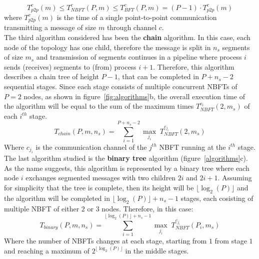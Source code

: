 \documentclass[../main.tex]{subfiles}
\begin{document}
\begin{equation}\label{eq:nbft-inequality}
    T^{c}_{p2p}(m) \leq T^{c}_{NBFT}(P,m) \leq T^{c}_{BFT}(P,m) = (P-1) \cdot T^{c}_{p2p}(m)
\end{equation}
where $T^{c}_{p2p}(m)$ is the time of a single point-to-point communication transmitting a message of size $m$ through channel $c$.\\
The third algorithm considered has been the \textbf{chain} algorithm. In this case, each node of the topology has one child, therefore the message is split in $n_s$ segments of size $m_s$ and transmission of segments continues in a pipeline where process $i$ sends (receives) segments to (from) process $i+1$. Therefore, this algorithm describes a chain tree of height $P-1$, that can be completed in $P+n_s-2$ sequential stages. Since each stage consists of multiple concurrent NBFTs of $P=2$ nodes, as shown in figure~\ref{fig:algorithms}b, the overall execution time of the algorithm will be equal to the sum of the maximum times $T^{c_i}_{NBFT}(2,m_s)$ of each $i^{th}$ stage.
\begin{equation}\label{eq:chain-time}
    T_{chain}(P,m,n_s) = \sum_{i=1}^{P+n_s-2} \underset{j_i}{\max}\; T^{c_{j_i}}_{NBFT}(2,m_s)
\end{equation}
Where $c_{j_i}$ is the communication channel of the $j^{th}$ NBFT running at the $i^{th}$ stage.\\
The last algorithm studied is the \textbf{binary tree} algorithm (figure~\ref{algorithms}c). As the name suggests, this algorithm is represented by a binary tree where each node $i$ exchanges segmented messages with two children $2i$ and $2i+1$. Assuming for simplicity that the tree is complete, then its height will be $\lfloor\log_2(P)\rfloor$ and the algorithm will be completed in $\lfloor\log_2(P)\rfloor+n_s-1$ stages, each cosisting of multiple NBFT of either $2$ or $3$ nodes. Therefore, in this case:
\begin{equation}\label{eq:binary-time}
    T_{binary}(P,m,n_s) = \sum_{i=1}^{\lfloor\log_2(P)\rfloor+n_s-1} \underset{j_i}{\max}\; T^{c_{j_i}}_{NBFT}(P_i,m_s)
\end{equation}
Where the number of NBFTs changes at each stage, starting from $1$ from stage $1$ and reaching a maximum of $2^{\lfloor\log_2(P)\rfloor}$ in the middle stages.\\

\end{document}
